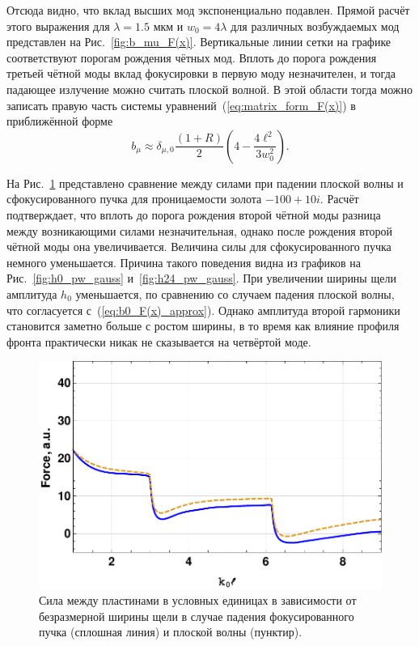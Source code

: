 Отсюда видно, что вклад высших мод экспоненциально подавлен. Прямой расчёт этого выражения для $\lambda = 1.5$ мкм и $w_0 = 4 \lambda$ для различных возбуждаемых мод представлен на Рис.~\ref{fig:b_mu_F(x)}. Вертикальные линии сетки на графике соответствуют порогам рождения чётных мод. Вплоть до порога рождения третьей чётной моды вклад фокусировки в первую моду незначителен, и тогда падающее излучение можно считать плоской волной. В этой области тогда можно записать правую часть системы уравнений~(\ref{eq:matrix_form_F(x)}) в приближённой форме
\begin{equation}
    b_\mu \approx \delta_{\mu,0}\frac{(1+R)}{2}(4 - \frac{4 \ell^2}{3 w_0^2}).
    \label{eq:b0_F(x)_approx}
\end{equation}

На Рис.~\ref{fig:Force_PW_Gauss_100_10} представлено сравнение между силами при падении плоской волны и сфокусированного пучка для проницаемости золота $-100 + 10i$. Расчёт подтверждает, что вплоть до порога рождения второй чётной моды разница между возникающими силами незначительная, однако после рождения второй чётной моды она увеличивается. Величина силы для сфокусированного пучка немного уменьшается. Причина такого поведения видна из графиков на Рис.~\ref{fig:h0_pw_gauss} и~\ref{fig:h24_pw_gauss}. При увеличении ширины щели амплитуда $h_0$ уменьшается, по сравнению со случаем падения плоской волны, что согласуется с~(\ref{eq:b0_F(x)_approx}). Однако амплитуда второй гармоники становится заметно больше с ростом ширины, в то время как влияние профиля фронта практически никак не сказывается на четвёртой моде.
\begin{figure}
    \centering
    \includegraphics[width=\textwidth]{figures/Force_PW_GAUSS.pdf}
    \caption{Сила между пластинами в условных единицах в зависимости от безразмерной ширины щели в случае падения фокусированного пучка (сплошная линия) и плоской волны (пунктир).}
    \label{fig:Force_PW_Gauss_100_10}
\end{figure}

